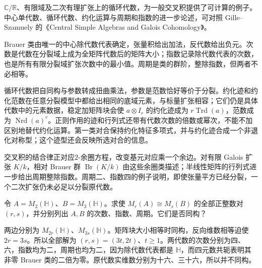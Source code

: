 \ProseParagraphBreak
\(\mathbb C/\mathbb R\)、有限域及二次有理扩张上的循环代数，为一般交叉积提供了可计算的例子。中心单代数、循环代数、约化运算与周期和指数的进一步论述，可对照 Gille–Szamuely 的《Central Simple Algebras and Galois Cohomology》\cite[Sections 2.4--2.8; Chapter 3]{GilleSzamuely2017CentralSimpleAlgebras}。







\begin{chaptersummary}
	Brauer 类由唯一的中心除代数代表确定，张量积给出加法，反代数给出负元。次数是代数在分裂域上成为全矩阵代数后的矩阵大小；指数记录除代数代表的次数，也是所有有限分裂域扩张次数中的最小值。周期是类的群阶，整除指数，但两者不必相等。

	\ProseParagraphBreak
	循环代数把自同构与参数转成扭曲乘法，参数是范数恰好等价于分裂。约化迹和约化范数在任意分裂模型中都给出相同的底域元素，与标量扩张相容；它们仍是具体代数中的元素数据，稳定加矩阵块会使 \(a\otimes I_r\) 的约化迹成为 \(r\operatorname{Trd}(a)\)，范数成为 \(\operatorname{Nrd}(a)^r\)。正则作用的迹和行列式还带有代数次数的倍数或幂次，不能不加区别地替代约化运算。第一类对合保持约化特征多项式，并与约化迹合成一个非退化对称型；这个迹型还会反映所选对合的信息。

	\ProseParagraphBreak
	交叉积的结合律正对应\(2\)-余圈方程，改变基元对应乘一个余边。对有限 Galois 扩张 \(K/k\)，相对 Brauer 群 \(\operatorname{Br}(K/k)\) 由这些余圈类描述；半线性矩阵的行列式进一步给出周期整除指数。周期二、指数四的例子说明，即使张量平方已经分裂，一个二次扩张仍未必足以分裂原代数。
\end{chaptersummary}

\BookExercises

\begin{exercise}\label{b2:ex:18-explicit-stabilization}
	令 \(A=M_2(\mathbb H)\)、\(B=M_3(\mathbb H)\)。求使 \(M_r(A)\cong M_s(B)\) 的全部正整数对 \((r,s)\)，并分别列出 \(A,B\) 的次数、指数、周期。它们是否同构？
\end{exercise}
\begin{solution}
	两边分别为 \(M_{2r}(\mathbb H)\)、\(M_{3s}(\mathbb H)\)。矩阵块大小相等时同构，反向维数相等迫使 \(2r=3s\)。所以全部解为 \((r,s)=(3t,2t)\)、\(t\ge1\)。两代数的次数分别为四、六，指数均为二，周期也均为二，因为除代数代表都是 \(\mathbb H\)，而四元数共轭表明其非零 Brauer 类的二倍为零。原代数实维数分别为十六、三十六，所以并不同构。
\end{solution}

